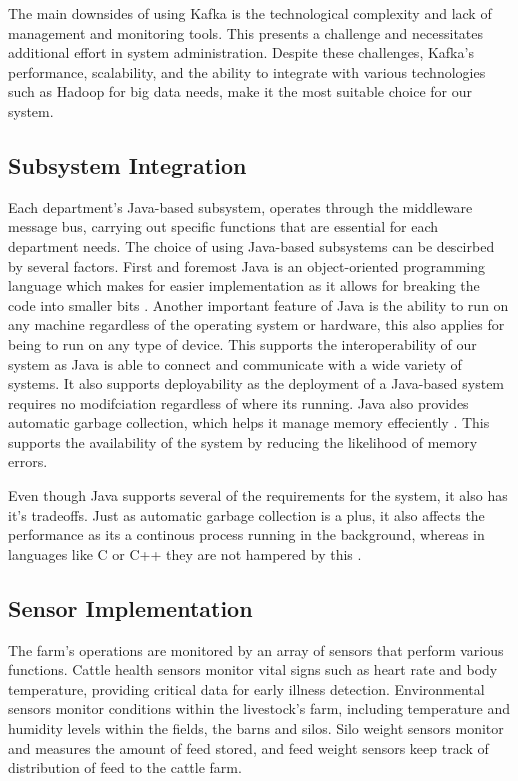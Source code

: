 \documentclass[conference]{IEEEtran}
\begin{document}
The main downsides of using Kafka is the technological complexity and lack of management and monitoring tools. This presents a challenge and necessitates additional effort in system administration. Despite these challenges, Kafka's performance, scalability, and the ability to integrate with various technologies such as Hadoop for big data needs, make it the most suitable choice for our system.


\subsection{Subsystem Integration}
Each department's Java-based subsystem, operates through the middleware message bus, carrying out specific functions that are essential for each department needs.
The choice of using Java-based subsystems can be descirbed by several factors. First and foremost Java is an object-oriented programming language which makes for easier implementation as it allows for breaking the code into smaller bits \cite{Team_2022}.
Another important feature of Java is the ability to run on any machine regardless of the operating system or hardware, this also applies for being to run on any type of device. This supports the interoperability of our system as Java is able to connect and communicate with a wide variety of systems. It also supports deployability as the deployment of a Java-based system requires no modifciation regardless of where its running.
Java also provides automatic garbage collection, which helps it manage memory effeciently \cite{Team_2022}. This supports the availability of the system by reducing the likelihood of memory errors.

Even though Java supports several of the requirements for the system, it also has it's tradeoffs. Just as automatic garbage collection is a plus, it also affects the performance as its a continous process running in the background, whereas in languages like C or C++ they are not hampered by this \cite{Team_2022}.

\subsection{Sensor Implementation}
The farm’s operations are monitored by an array of sensors that perform various functions. Cattle health sensors monitor vital signs such as heart rate and body temperature, providing critical data for early illness detection. Environmental sensors monitor conditions within the livestock's farm, including temperature and humidity levels within the fields, the barns and silos. Silo weight sensors monitor and measures the amount of feed stored, and feed weight sensors keep track of distribution of feed to the cattle farm.
\end{document}
